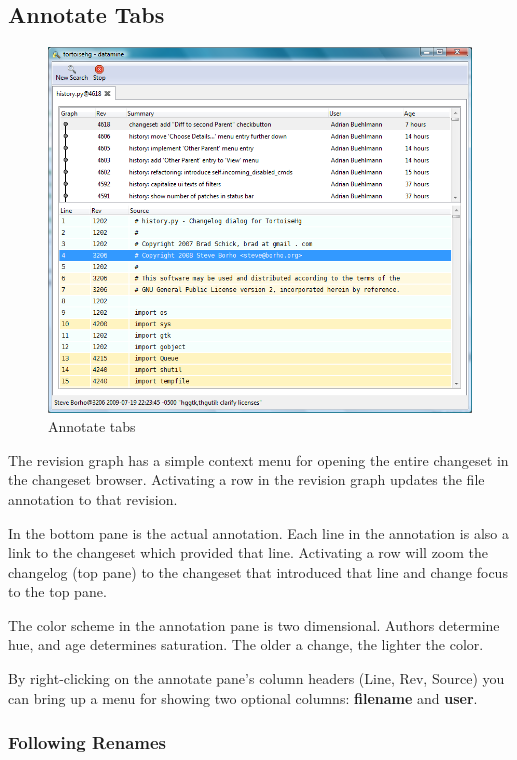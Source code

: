 \documentclass[letterpaper,10pt,english]{manual}
\begin{document}
\subsection{Annotate Tabs}
\begin{figure}[htbp]
\centering

\includegraphics{annotate.png}
\caption{Annotate tabs}\end{figure}

The revision graph has a simple context menu for opening the entire
changeset in the changeset browser. Activating a row in the revision
graph updates the file annotation to that revision.

In the bottom pane is the actual annotation. Each line in the annotation
is also a link to the changeset which provided that line. Activating a
row will zoom the changelog (top pane) to the changeset that introduced
that line and change focus to the top pane.

The color scheme in the annotation pane is two dimensional. Authors
determine hue, and age determines saturation. The older a change, the
lighter the color.

By right-clicking on the annotate pane's column headers (Line, Rev,
Source) you can bring up a menu for showing two optional columns:
\textbf{filename} and \textbf{user}.


\subsubsection{Following Renames}
\end{document}
